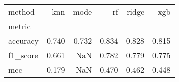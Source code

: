 \begin{tabular}{lrrrrr}
\toprule
method & knn & mode & rf & ridge & xgb \\
metric &  &  &  &  &  \\
\midrule
accuracy & 0.740 & 0.732 & 0.834 & 0.828 & 0.815 \\
f1_score & 0.661 & NaN & 0.782 & 0.779 & 0.775 \\
mcc & 0.179 & NaN & 0.470 & 0.462 & 0.448 \\
\bottomrule
\end{tabular}

